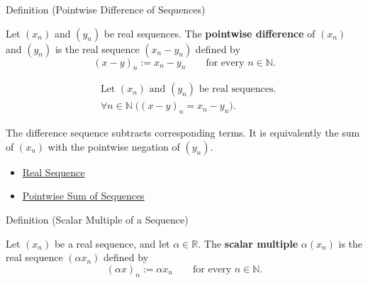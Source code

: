 
\begin{definitionbox}{Definition (Pointwise Difference of Sequences)}
\begin{definition}
\label{def:pointwise-difference-sequence}
Let $(x_n)$ and $(y_n)$ be real sequences. The \textbf{pointwise difference}
of $(x_n)$ and $(y_n)$ is the real sequence $(x_n-y_n)$ defined by
\[
(x-y)_n := x_n-y_n
\qquad
\text{for every } n\in\mathbb{N}.
\]
\end{definition}
\end{definitionbox}

\begin{remark*}
\[
\begin{aligned}
&\text{Let } (x_n) \text{ and } (y_n) \text{ be real sequences.}\\
&\forall n\in\mathbb{N}\;\bigl((x-y)_n=x_n-y_n\bigr).
\end{aligned}
\]
\end{remark*}

\begin{remark*}[Interpretation]
The difference sequence subtracts corresponding terms. It is equivalently the
sum of $(x_n)$ with the pointwise negation of $(y_n)$.
\end{remark*}

\begin{dependencies}
\begin{itemize}
  \item \hyperref[def:real-sequence]{Real Sequence}
  \item \hyperref[def:pointwise-sum-sequence]{Pointwise Sum of Sequences}
\end{itemize}
\end{dependencies}


\begin{definitionbox}{Definition (Scalar Multiple of a Sequence)}
\begin{definition}
\label{def:scalar-multiple-sequence}
Let $(x_n)$ be a real sequence, and let $\alpha\in\mathbb{R}$. The
\textbf{scalar multiple} $\alpha(x_n)$ is the real sequence
$(\alpha x_n)$ defined by
\[
(\alpha x)_n := \alpha x_n
\qquad
\text{for every } n\in\mathbb{N}.
\]
\end{definition}
\end{definitionbox}

